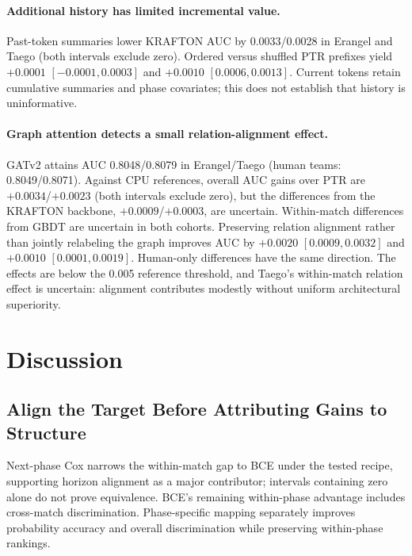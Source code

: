 \documentclass[sigconf,anonymous,nonacm]{acmart}
\begin{document}
\paragraph{Additional history has limited incremental value.}
Past-token summaries lower KRAFTON AUC by 0.0033/0.0028 in Erangel and Taego (both intervals exclude zero). Ordered versus shuffled PTR prefixes yield $+0.0001$ $[-0.0001,\allowbreak 0.0003]$ and $+0.0010$ $[0.0006,\allowbreak 0.0013]$. Current tokens retain cumulative summaries and phase covariates; this does not establish that history is uninformative.

\paragraph{Graph attention detects a small relation-alignment effect.}
GATv2 attains AUC 0.8048/0.8079 in Erangel/Taego (human teams: 0.8049/0.8071). Against CPU references, overall AUC gains over PTR are $+0.0034$/$+0.0023$ (both intervals exclude zero), but the differences from the KRAFTON backbone, $+0.0009$/$+0.0003$, are uncertain. Within-match differences from GBDT are uncertain in both cohorts. Preserving relation alignment rather than jointly relabeling the graph improves AUC by $+0.0020$ $[0.0009,\allowbreak 0.0032]$ and $+0.0010$ $[0.0001,\allowbreak 0.0019]$. Human-only differences have the same direction. The effects are below the 0.005 reference threshold, and Taego's within-match relation effect is uncertain: alignment contributes modestly without uniform architectural superiority.



\section{Discussion}
\label{sec:discussion}
\subsection{Align the Target Before Attributing Gains to Structure}
\label{sec:discussion:drivers}
Next-phase Cox narrows the within-match gap to BCE under the tested recipe, supporting horizon alignment as a major contributor; intervals containing zero alone do not prove equivalence. BCE's remaining within-phase advantage includes cross-match discrimination. Phase-specific mapping separately improves probability accuracy and overall discrimination while preserving within-phase rankings.
\end{document}
